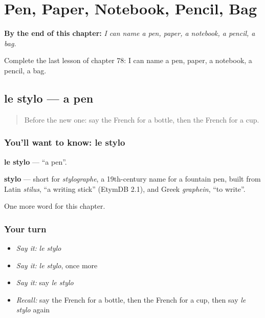 
\chapter{Pen, Paper, Notebook, Pencil, Bag}
\label{ch:fr-pen-paper-notebook-pencil-bag}

\begin{chapteropening}
\textbf{By the end of this chapter:} \emph{I can name a pen, paper, a notebook, a pencil, a bag.}

Complete the last lesson of chapter 78: I can name a pen, paper, a notebook, a pencil, a bag.
\end{chapteropening}

\section[le stylo]{le stylo — a pen}

\label{lesson:FR-C78-stylo}



\begin{quote}
Before the new one: say the French for a bottle, then the French for a cup.
\end{quote}

\subsection*{You'll want to know: le stylo}
\textbf{le stylo} — \textquotedblleft{}a pen\textquotedblright{}.

\begin{cousinweb}
\textbf{stylo} — short for \emph{stylographe}, a 19th-century name for a fountain pen, built from Latin \emph{stilus}, \textquotedblleft{}a writing stick\textquotedblright{} (EtymDB 2.1), and Greek \emph{graphein}, \textquotedblleft{}to write\textquotedblright{}.
\end{cousinweb}

\begin{grammarlens}[title={What you've built}]
One more word for this chapter.
\end{grammarlens}

\subsection*{Your turn}
\begin{itemize}
\raggedright
  \item \emph{Say it:} \emph{le stylo}
  \item \emph{Say it:} \emph{le stylo}, once more
  \item \emph{Say it:} say \emph{le stylo}
  \item \emph{Recall:} say the French for a bottle, then the French for a cup, then say \emph{le stylo} again
\end{itemize}

